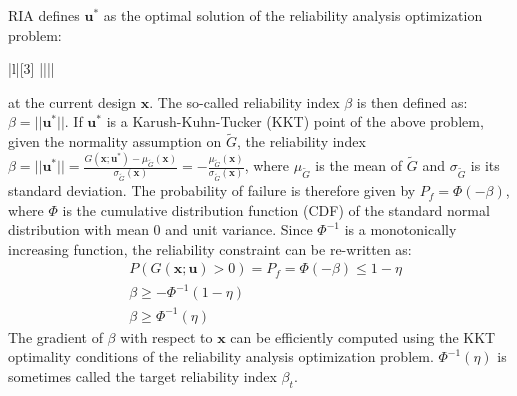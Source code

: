 RIA defines $\bm{u}^*$ as the optimal solution of the reliability analysis optimization problem:
\begin{mini!}|l|[3]
 {}{||||}{}{}
\end{mini!}
at the current design $\bm{x}$. The so-called reliability index $\beta$ is then defined as: $\beta = ||\bm{u}^*||$. If $\bm{u}^*$ is a Karush-Kuhn-Tucker (KKT) point of the above problem, given the normality assumption on $\tilde{G}$, the reliability index $\beta = ||\bm{u}^*|| = \frac{G(\bm{x}; \bm{u}^*) - \mu_{\tilde{G}}(\bm{x})}{\sigma_{\tilde{G}}(\bm{x})} = -\frac{\mu_{\tilde{G}}(\bm{x})}{\sigma_{\tilde{G}}(\bm{x})}$, where $\mu_{\tilde{G}}$ is the mean of $\tilde{G}$ and $\sigma_{\tilde{G}}$ is its standard deviation. The probability of failure is therefore given by $P_f = \Phi(-\beta)$, where $\Phi$ is the cumulative distribution function (CDF) of the standard normal distribution with mean 0 and unit variance. Since $\Phi^{-1}$ is a monotonically increasing function, the reliability constraint can be re-written as:
\begin{align}
 & P(G(\bm{x}; \bm{u}) > 0) = P_f = \Phi(-\beta) \leq 1 - \eta \\
 & \beta \geq -\Phi^{-1}(1 - \eta) \\
 & \beta \geq \Phi^{-1}(\eta)
\end{align}
The gradient of $\beta$ with respect to $\bm{x}$ can be efficiently computed using the KKT optimality conditions of the reliability analysis optimization problem. $\Phi^{-1}(\eta)$ is sometimes called the target reliability index $\beta_t$.

